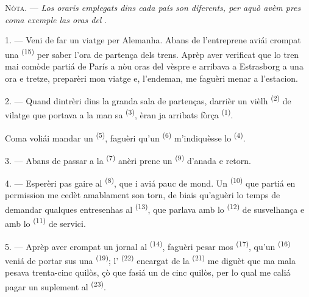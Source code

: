 
\VUsaut{4.0mm}
\VUsaut{2.4mm}
\VUsaut{3.4mm}
\textsc{Nòta.} --- \textit{Los oraris emplegats dins cada país son diferents, per
aquò avèm pres coma exemple las oras del} .

1. --- Veni de far un viatge per Alemanha. Abans de l'entreprene aviái crompat una
 \textsuperscript{(15)} per saber l'ora de partença dels
trens. Aprèp aver verificat que lo tren mai comòde partiá de París a nòu oras del
vèspre e arribava a Estrasborg a una ora e tretze, preparèri mon viatge e,
l'endeman, me faguèri menar a l'estacion.

2. --- Quand dintrèri dins la granda sala de partenças, darrièr un vièlh
 \textsuperscript{(2)} de vilatge que portava a la man sa
 \textsuperscript{(3)}, èran ja arribats fòrça
 \textsuperscript{(1)}.

Coma voliái mandar un  \textsuperscript{(5)}, faguèri qu'un
 \textsuperscript{(6)} m'indiquèsse lo  \textsuperscript{(4)}.

3. --- Abans de passar a la  \textsuperscript{(7)} anèri
prene un  \textsuperscript{(9)} d'anada e retorn.

4. --- Esperèri pas gaire al  \textsuperscript{(8)}, que i aviá
pauc de mond. Un  \textsuperscript{(10)} que partiá en permission me
cedèt amablament son torn, de biais qu'aguèri lo temps de demandar qualques
entresenhas al  \textsuperscript{(13)}, que parlava amb lo
 \textsuperscript{(12)} de susvelhança e amb lo
 \textsuperscript{(11)} de servici.

\VUsaut{3.0mm}

5. --- Aprèp aver crompat un jornal al 
\textsuperscript{(14)}, faguèri pesar mos 
\textsuperscript{(17)}, qu'un  \textsuperscript{(16)} veniá de
portar sus una  \textsuperscript{(19)}; l'
\textsuperscript{(22)} encargat de la  \textsuperscript{(21)} me
diguèt que ma mala pesava trenta-cinc quilòs, çò que fasiá un  de
cinc quilòs, per lo qual me caliá pagar un suplement al  \textsuperscript{(23)}.

